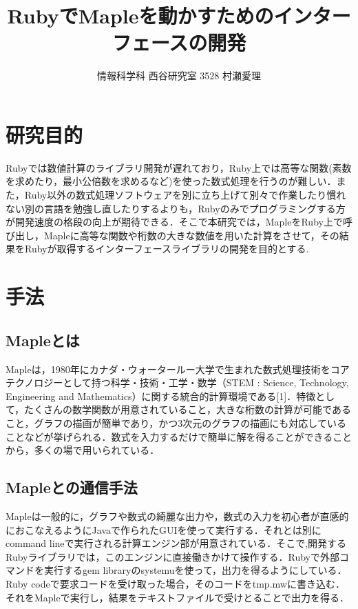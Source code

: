 \documentclass[10pt,a4j,twocolumn]{jsarticle}
\begin{document}
\title{RubyでMapleを動かすためのインターフェースの開発}
\author{情報科学科 西谷研究室 3528 村瀬愛理}
\date{}
\maketitle
\section{研究目的}
Rubyでは数値計算のライブラリ開発が遅れており，Ruby上では高等な関数(素数を求めたり，最小公倍数を求めるなど)を使った数式処理を行うのが難しい．また，Ruby以外の数式処理ソフトウェアを別に立ち上げて別々で作業したり慣れない別の言語を勉強し直したりするよりも，Rubyのみでプログラミングする方が開発速度の格段の向上が期待できる．そこで本研究では，MapleをRuby上で呼び出し，Mapleに高等な関数や桁数の大きな数値を用いた計算をさせて，その結果をRubyが取得するインターフェースライブラリの開発を目的とする.

\section{手法}
\subsection{Mapleとは}
Mapleは，1980年にカナダ・ウォータールー大学で生まれた数式処理技術をコアテクノロジーとして持つ科学・技術・工学・数学（STEM : Science, Technology, Engineering and Mathematics）に関する統合的計算環境である[1]．特徴として，たくさんの数学関数が用意されていること，大きな桁数の計算が可能であること，グラフの描画が簡単であり，かつ3次元のグラフの描画にも対応していることなどが挙げられる．数式を入力するだけで簡単に解を得ることができることから，多くの場で用いられている．

\subsection{Mapleとの通信手法}
Mapleは一般的に，グラフや数式の綺麗な出力や，数式の入力を初心者が直感的におこなえるようにJavaで作られたGUIを使って実行する．それとは別にcommand lineで実行される計算エンジン部が用意されている．そこで,開発するRubyライブラリでは，このエンジンに直接働きかけて操作する．Rubyで外部コマンドを実行するgem libraryのsystemuを使って，出力を得るようにしている．Ruby codeで要求コードを受け取った場合，そのコードをtmp.mwに書き込む．それをMapleで実行し，結果をテキストファイルで受けとることで出力を得る．
\end{document}
